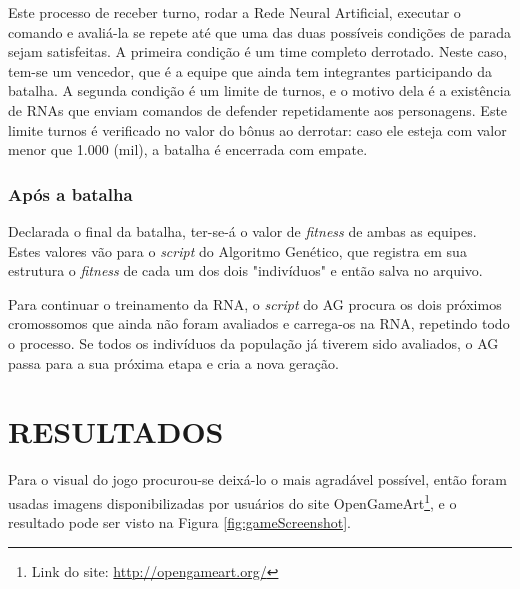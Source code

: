 \documentclass[
	12pt,					%
	openright,				%
	oneside,				%
	a4paper,				%
	bibjustif,				%
	chapter=TITLE,			%
	english,				%
	brazil,					%
	]{abntex2}
\begin{document}
	Este processo de receber turno,
	rodar a Rede Neural Artificial,
	executar o comando e avaliá-la
	se repete até que uma das duas possíveis condições de parada sejam satisfeitas.
	A primeira condição é um time completo derrotado.
	Neste caso, tem-se um vencedor, que é a equipe que ainda tem integrantes participando da batalha.
	A segunda condição é um limite de turnos,
	e o motivo dela é a existência de RNAs que enviam comandos de defender repetidamente aos personagens.
	Este limite turnos é verificado no valor do bônus ao derrotar:
	caso ele esteja com valor menor que 1.000 (mil),
	a batalha é encerrada com empate.
	
	\subsection{Após a batalha}
	Declarada o final da batalha,
	ter-se-á o valor de \textit{fitness} de ambas as equipes.
	Estes valores vão para o \textit{script} do Algoritmo Genético,
	que registra em sua estrutura o \textit{fitness} de cada um dos dois "indivíduos"{} e então salva no arquivo.
	
	Para continuar o treinamento da RNA,
	o \textit{script} do AG procura os dois próximos cromossomos que ainda não foram avaliados e carrega-os na RNA,
	repetindo todo o processo.
	Se todos os indivíduos da população já tiverem sido avaliados,
	o AG passa para a sua próxima etapa e cria a nova geração.


\FloatBarrier
\newpage %
\chapter{RESULTADOS}

	Para o visual do jogo procurou-se deixá-lo o mais agradável possível,
	então foram usadas imagens disponibilizadas por usuários do site OpenGameArt\footnote{Link do site: \url{http://opengameart.org/}},
	e o resultado pode ser visto na Figura \ref{fig:gameScreenshot}.
\end{document}
